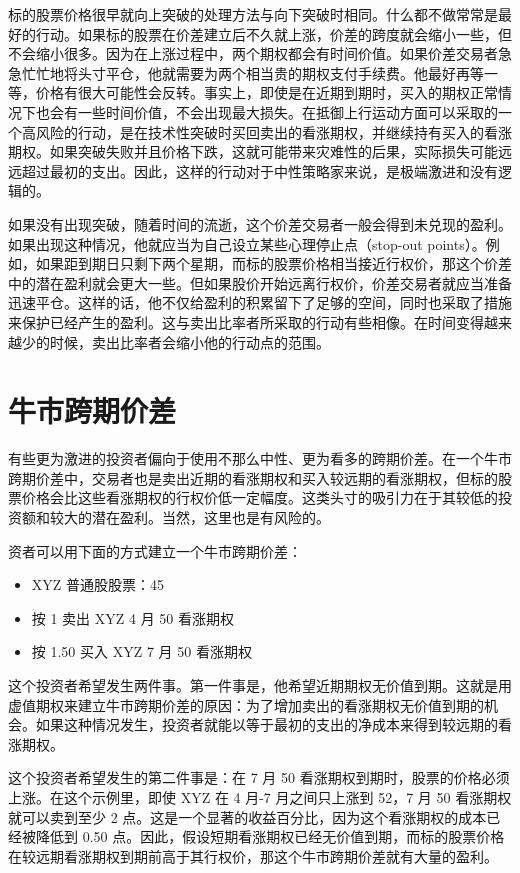 标的股票价格很早就向上突破的处理方法与向下突破时相同。什么都不做常常是最好的行动。如果标的股票在价差建立后不久就上涨，价差的跨度就会缩小一些，但不会缩小很多。因为在上涨过程中，两个期权都会有时间价值。如果价差交易者急急忙忙地将头寸平仓，他就需要为两个相当贵的期权支付手续费。他最好再等一等，价格有很大可能性会反转。事实上，即使是在近期到期时，买入的期权正常情况下也会有一些时间价值，不会出现最大损失。在抵御上行运动方面可以采取的一个高风险的行动，是在技术性突破时买回卖出的看涨期权，并继续持有买入的看涨期权。如果突破失败并且价格下跌，这就可能带来灾难性的后果，实际损失可能远远超过最初的支出。因此，这样的行动对于中性策略家来说，是极端激进和没有逻辑的。

如果没有出现突破，随着时间的流逝，这个价差交易者一般会得到未兑现的盈利。如果出现这种情况，他就应当为自己设立某些心理停止点（stop-out points）。例如，如果距到期日只剩下两个星期，而标的股票价格相当接近行权价，那这个价差中的潜在盈利就会更大一些。但如果股价开始远离行权价，价差交易者就应当准备迅速平仓。这样的话，他不仅给盈利的积累留下了足够的空间，同时也采取了措施来保护已经产生的盈利。这与卖出比率者所采取的行动有些相像。在时间变得越来越少的时候，卖出比率者会缩小他的行动点的范围。

\section{牛市跨期价差}
有些更为激进的投资者偏向于使用不那么中性、更为看多的跨期价差。在一个牛市跨期价差中，交易者也是卖出近期的看涨期权和买入较远期的看涨期权，但标的股票价格会比这些看涨期权的行权价低一定幅度。这类头寸的吸引力在于其较低的投资额和较大的潜在盈利。当然，这里也是有风险的。

资者可以用下面的方式建立一个牛市跨期价差：
\begin{itemize}
    \item XYZ 普通股股票：45
    \item 按 1 卖出 XYZ 4 月 50 看涨期权
    \item 按 1.50 买入 XYZ 7 月 50 看涨期权
\end{itemize}
这个投资者希望发生两件事。第一件事是，他希望近期期权无价值到期。这就是用虚值期权来建立牛市跨期价差的原因：为了增加卖出的看涨期权无价值到期的机会。如果这种情况发生，投资者就能以等于最初的支出的净成本来得到较远期的看涨期权。

这个投资者希望发生的第二件事是：在 7 月 50 看涨期权到期时，股票的价格必须上涨。在这个示例里，即使 XYZ 在 4 月-7 月之间只上涨到 52，7 月 50 看涨期权就可以卖到至少 2 点。这是一个显著的收益百分比，因为这个看涨期权的成本已经被降低到 0.50 点。因此，假设短期看涨期权已经无价值到期，而标的股票价格在较远期看涨期权到期前高于其行权价，那这个牛市跨期价差就有大量的盈利。

